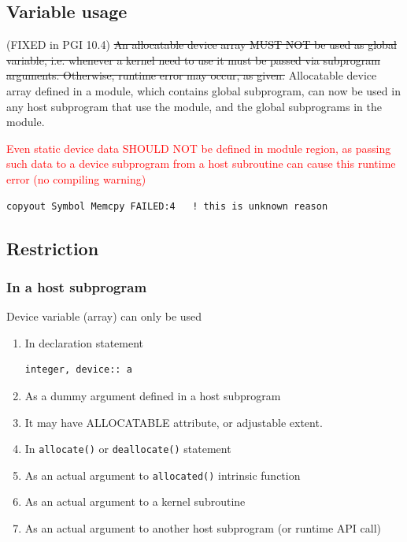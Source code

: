 \subsection{Variable usage}
\label{sec:variable-usage}

(FIXED in PGI 10.4)
\st{An allocatable device array MUST NOT be used as global variable,
  i.e. whenever a kernel need to use it must be passed via subprogram
  arguments. Otherwise, runtime error may occur, as given.}
Allocatable device array defined in a module, which contains global
subprogram, can now be used in any host subprogram that use the
module, and the global subprograms in the module.


\textcolor{red}{Even static device data SHOULD NOT be defined in module
  region, as passing such data to a device subprogram from a host
  subroutine can cause this runtime error (no compiling warning)}
\begin{verbatim}
copyout Symbol Memcpy FAILED:4   ! this is unknown reason
\end{verbatim}


\subsection{Restriction}
\label{sec:restriction-1}

\subsubsection{In a host subprogram}
\label{sec:host-subprogram}

Device variable (array) can only be used 
\begin{enumerate}
\item In declaration statement
\begin{lstlisting}
integer, device:: a
\end{lstlisting}
\item As a dummy argument defined in a host subprogram
\item It may have ALLOCATABLE attribute, or adjustable extent.
\item In \verb!allocate()! or \verb!deallocate()! statement
\item As an actual argument to \verb!allocated()! intrinsic function
\item As an actual argument to a kernel subroutine
\item As an actual argument to another host subprogram (or runtime API
  call)
\end{enumerate}


